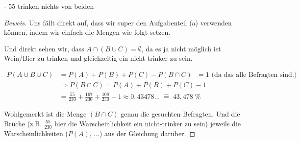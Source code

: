 \documentclass[10pt]{article}
\begin{document}
- $55$ trinken nichts von beiden
\begin{proof}[Beweis]
Uns fällt direkt auf, dass wir super den Aufgabenteil (a) verwenden können, indem wir einfach die Mengen wie folgt setzen.

\indent {}

\indent {}

\indent {}

Und direkt sehen wir, dass $A \cap (B \cup C) = \emptyset$, da es ja nicht möglich ist Wein/Bier zu trinken und gleichzeitig ein nicht-trinker zu sein.

\begin{align*}
P(A \cup B \cup C) &= P(A) + P(B) + P(C) - P(B \cap C) \text{ $= 1$ (da das alle Befragten sind.)} \\
&\Rightarrow P(B \cap C) = P(A) + P(B) + P(C) - 1 \\
&= \frac{55}{230} + \frac{167}{230} + \frac{108}{230} - 1 \approx 0,43478 \ldots \; \hat{=}\; 43,478 \; \%
\end{align*}

Wohlgemerkt ist die Menge $(B \cap C)$ genau die gesuchten Befragten. Und die Brüche (z.B. $\frac{55}{230}$ hier die Warscheinlichkeit ein nicht-trinker zu sein) jeweils die Warscheinlichkeiten ($P(A)$, ...) aus der Gleichung darüber.

\end{proof}
\end{document}
